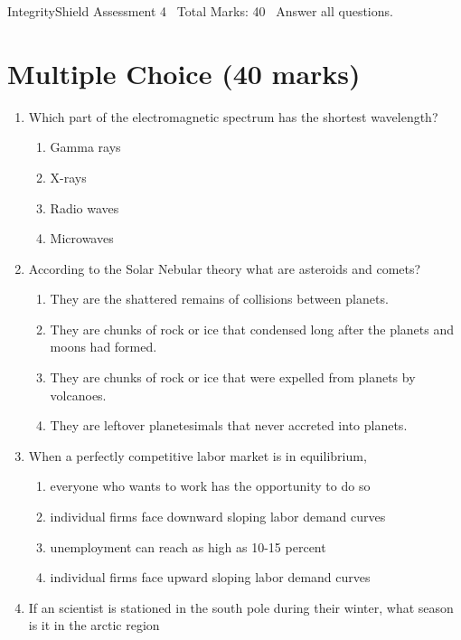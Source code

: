 \documentclass[12pt]{article}
\begin{document}
\begin{center}
IntegrityShield Assessment 4 \
Total Marks: 40 \
Answer all questions.
\end{center}

\section*{Multiple Choice (40 marks)}
\begin{enumerate}[label=\arabic*.]
\item Which part of the electromagnetic spectrum has the shortest wavelength?
\begin{enumerate}[label=(\alph*)]
    \item Gamma rays
    \item X-rays
    \item Radio waves
    \item Microwaves
\end{enumerate}
\item According to the Solar Nebular theory what are asteroids and comets?
\begin{enumerate}[label=(\alph*)]
    \item They are the shattered remains of collisions between planets.
    \item They are chunks of rock or ice that condensed long after the planets and moons had formed.
    \item They are chunks of rock or ice that were expelled from planets by volcanoes.
    \item They are leftover planetesimals that never accreted into planets.
\end{enumerate}
\item When a perfectly competitive labor market is in equilibrium,
\begin{enumerate}[label=(\alph*)]
    \item everyone who wants to work has the opportunity to do so
    \item individual firms face downward sloping labor demand curves
    \item unemployment can reach as high as 10-15 percent
    \item individual firms face upward sloping labor demand curves
\end{enumerate}
\item If an scientist is stationed in the south pole during their winter, what season is it in the arctic region
\begin{enumerate}[label=(\alph*)]

\end{enumerate}
\end{enumerate}
\end{document}
